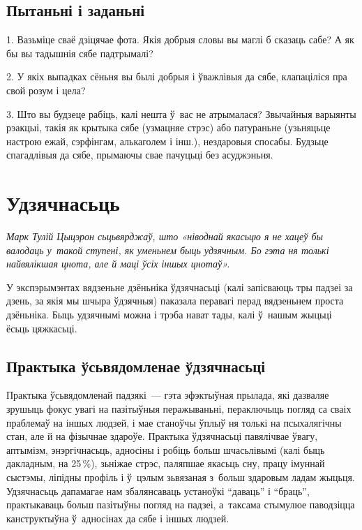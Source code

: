 \subsection*{Пытаньні і заданьні}

1. Вазьміце сваё дзіцячае фота. Якія добрыя словы вы маглі б сказаць сабе? А як бы вы тадышнія сябе падтрымалі?

2. У якіх выпадках сёньня вы былі добрыя і ўважлівыя да сябе, клапаціліся пра свой розум і цела?

3. Што вы будзеце рабіць, калі нешта ў~вас не атрымалася? Звычайныя варыянты рэакцыі, такія як крытыка сябе (узмацняе стрэс) або патураньне (узьняцьце настрою ежай, сэрфінгам, алькаголем і інш.), нездаровыя спосабы. Будзьце спагадлівыя да сябе, прымаючы свае пачуцьці без асуджэньня.


\section{Удзячнасьць}

\emph{Марк Тулій Цыцэрон сьцьвярджаў, што «ніводнай якасьцю я не хацеў бы валодаць у~такой ступені, як уменьнем быць удзячным. Бо гэта ня толькі найвялікшая цнота, але й маці ўсіх іншых цнотаў».}

У экспэрымэнтах вядзеньне дзёньніка ўдзячнасьці (калі запісваюць тры падзеі за дзень, за якія мы шчыра ўдзячныя) паказала перавагі перад вядзеньнем проста дзёньніка. Быць удзячнымі можна і трэба нават тады, калі ў~нашым жыцьці ёсьць цяжкасьці.

\subsection*{Практыка ўсьвядомленае ўдзячнасьці}

Практыка ўсьвядомленай падзякі~--- гэта эфэктыўная прылада, які дазваляе зрушыць фокус увагі на пазітыўныя перажываньні, пераключыць погляд са сваіх праблемаў на іншых людзей, і мае станоўчы ўплыў ня толькі на псыхалягічны стан, але й на фізычнае здароўе. Практыка ўдзячнасьці павялічвае ўвагу, аптымізм, энэргічнасьць, адносіны і робіць больш шчасьлівымі (калі быць дакладным, на 25\,\%), зьніжае стрэс, паляпшае якасьць сну, працу імуннай сыстэмы, ліпідны профіль і ў~цэлым зьвязаная з~больш здаровым ладам жыцьця. Удзячнасьць дапамагае нам збалянсаваць устаноўкі ``даваць'' і ``браць'', практыкаваць больш пазітыўны погляд на падзеі, а~таксама стымулюе паводзіцца канструктыўна ў~адносінах да сябе і іншых людзей.

